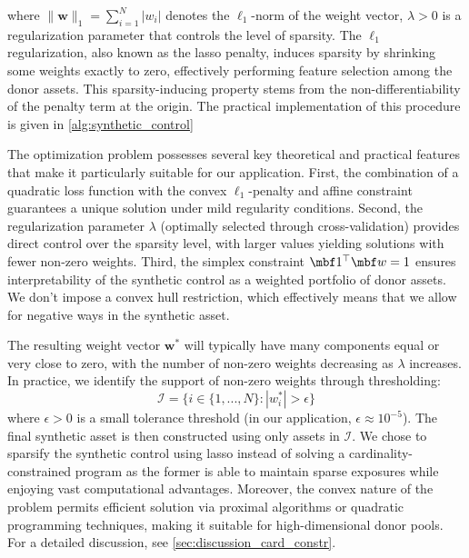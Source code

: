 where $\|\mathbf{w}\|_1 = \sum_{i=1}^N |w_i|$ denotes the $\ell_1$-norm of the weight vector, $\lambda > 0$ is a regularization parameter that controls the level of sparsity.
The $\ell_1$ regularization, also known as the lasso penalty, induces sparsity by shrinking some weights exactly to zero, effectively performing feature selection among the donor assets. This sparsity-inducing property stems from the non-differentiability of the penalty term at the origin. %
The practical implementation of this procedure is given in \cref{alg:synthetic_control}

The optimization problem possesses several key theoretical and practical features that make it particularly suitable for our application. First, the combination of a quadratic loss function with the convex $\ell_1$-penalty and affine constraint guarantees a unique solution under mild regularity conditions. %
Second, the regularization parameter $\lambda$ (optimally selected through cross-validation) provides direct control over the sparsity level, with larger values yielding solutions with fewer non-zero weights. Third, the simplex constraint $\mbf 1^\top \mbf w = 1$ ensures interpretability of the synthetic control as a weighted portfolio of donor assets. We don't impose a convex hull restriction, which effectively means that we allow for negative ways in the synthetic asset.

The resulting weight vector $\mathbf{w}^*$ will typically have many components equal or very close to zero, with the number of non-zero weights decreasing as $\lambda$ increases. In practice, we identify the support of non-zero weights through thresholding:
\begin{equation*}
\mathcal{I} = \{i \in \{1,...,N\} : |w^*_i| > \epsilon\}
\end{equation*}
where $\epsilon > 0$ is a small tolerance threshold (in our application, $\epsilon \approx 10^{-5}$). The final synthetic asset is then constructed using only assets in $\mathcal{I}$. We chose to sparsify the synthetic control using lasso instead of solving a cardinality-constrained program as the former is able to maintain sparse exposures while enjoying vast computational advantages. Moreover, the convex nature of the problem permits efficient solution via proximal algorithms or quadratic programming techniques, making it suitable for high-dimensional donor pools. For a detailed discussion, see \cref{sec:discussion_card_constr}.


